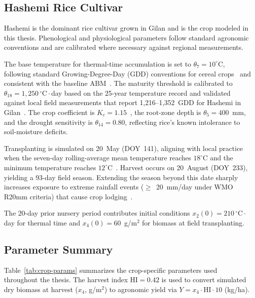 \subsection{Hashemi Rice Cultivar}
\label{ssec:sys-rice}

Hashemi is the dominant rice cultivar grown in Gilan and is the crop
modeled in this thesis. Phenological and physiological parameters
follow standard agronomic conventions and are calibrated where necessary
against regional measurements.

The base temperature for thermal-time accumulation is set to
$\theta_7 = 10^{\circ}$C, following standard Growing-Degree-Day (GDD)
conventions for cereal crops~\cite{mcmaster1997,laohasiriwong2023} and
consistent with the baseline ABM~\cite{Lopezjimenez2024}. The maturity
threshold is calibrated to $\theta_{18} = 1{,}250\,^{\circ}\mathrm{C}\cdot$day
based on the 25-year temperature record and validated against local
field measurements that report 1{,}216--1{,}352~GDD for Hashemi in
Gilan~\cite{sadidi2021}. The crop coefficient is
$K_c = 1.15$~\cite{allen1998,jalali2021}, the root-zone depth is
$\theta_5 = 400$~mm, and the drought sensitivity is $\theta_{14} = 0.80$,
reflecting rice's known intolerance to soil-moisture deficits.

Transplanting is simulated on 20~May (DOY~141), aligning with local
practice when the seven-day rolling-average mean temperature reaches
$18^{\circ}$C and the minimum temperature reaches
$12^{\circ}$C~\cite{faghani2011,sarma2018}. Harvest occurs on
20~August (DOY~233), yielding a 93-day field season. Extending the
season beyond this date sharply increases exposure to extreme rainfall
events ($\geq$~20~mm/day under WMO R20mm criteria) that cause crop
lodging~\cite{nayak2011,raoufi2025,tasteiran_harvest}.

The 20-day prior nursery period contributes initial conditions
$x_2(0) = 210\,^{\circ}\mathrm{C}\cdot$day for thermal time and
$x_4(0) = 60$~g/m$^2$ for biomass at field transplanting.

\subsection{Parameter Summary}
\label{ssec:sys-paramsum}

Table~\ref{tab:crop-params} summarizes the crop-specific parameters used
throughout the thesis. The harvest index $\mathrm{HI} = 0.42$ is used
to convert simulated dry biomass at harvest ($x_4$, g/m$^2$) to
agronomic yield via $Y = x_4 \cdot \mathrm{HI} \cdot 10$ (kg/ha).

